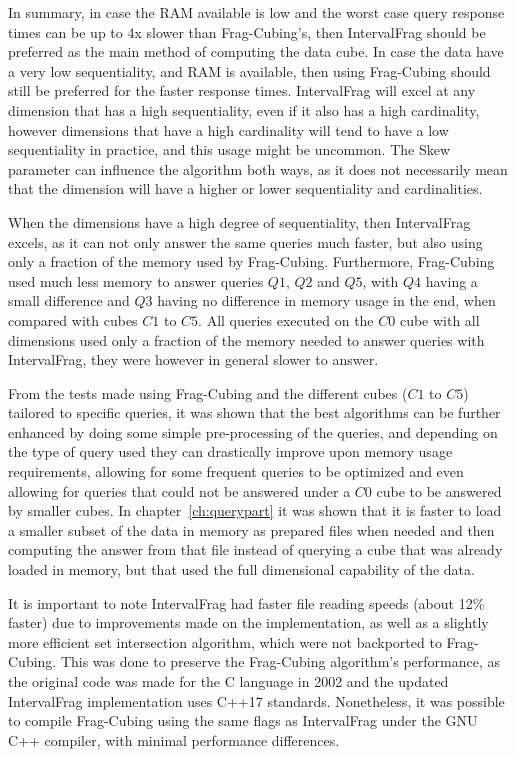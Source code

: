 In summary, in case the RAM available is low and the worst case query response times can be up to 4x slower than Frag-Cubing's, then IntervalFrag should be preferred as the main method of computing the data cube.
In case the data have a very low sequentiality, and RAM is available, then using Frag-Cubing should still be preferred for the faster response times.
IntervalFrag will excel at any dimension that has a high sequentiality, even if it also has a high cardinality, however dimensions that have a high cardinality will tend to have a low sequentiality in practice, and this usage might be uncommon.
The Skew parameter can influence the algorithm both ways, as it does not necessarily mean that the dimension will have a higher or lower sequentiality and cardinalities.

When the dimensions have a high degree of sequentiality, then IntervalFrag excels, as it can not only answer the same queries much faster, but also using only a fraction of the memory used by Frag-Cubing.
Furthermore, Frag-Cubing used much less memory to answer queries $Q1$, $Q2$ and $Q5$, with $Q4$ having a small difference and $Q3$ having no difference in memory usage in the end, when compared with cubes $C1$ to $C5$.
All queries executed on the $C0$ cube with all dimensions used only a fraction of the memory needed to answer queries with IntervalFrag, they were however in general slower to answer.

From the tests made using Frag-Cubing and the different cubes ($C1$ to $C5$) tailored to specific queries, it was shown that the best algorithms can be further enhanced by doing some simple pre-processing of the queries, and depending on the type of query used they can drastically improve upon memory usage requirements, allowing for some frequent queries to be optimized and even allowing for queries that could not be answered under a $C0$ cube to be answered by smaller cubes.
In chapter~\ref{ch:querypart} it was shown that it is faster to load a smaller subset of the data in memory as prepared files when needed and then computing the answer from that file instead of querying a cube that was already loaded in memory, but that used the full dimensional capability of the data.

It is important to note IntervalFrag had faster file reading speeds (about 12\% faster) due to improvements made on the implementation, as well as a slightly more efficient set intersection algorithm, which were not backported to Frag-Cubing.
This was done to preserve the Frag-Cubing algorithm's performance, as the original code was made for the C language in 2002 and the updated IntervalFrag implementation uses C++17 standards.
Nonetheless, it was possible to compile Frag-Cubing using the same flags as IntervalFrag under the GNU C++ compiler, with minimal performance differences.

